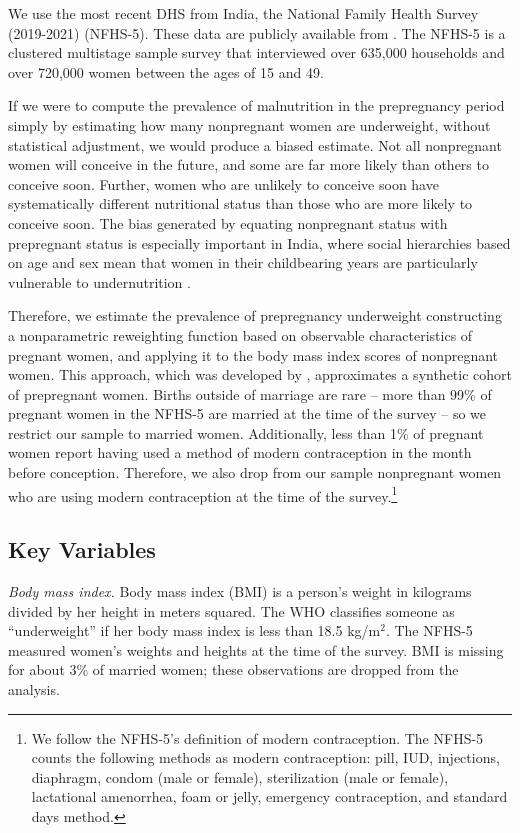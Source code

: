 \documentclass[12pt]{article}
\begin{document}
We use the most recent DHS from India, the National Family Health Survey (2019-2021) (NFHS-5). These data are publicly available from .  The NFHS-5 is a clustered multistage sample survey that interviewed over 635,000 households and over 720,000 women between the ages of 15 and 49.

If we were to compute the prevalence of malnutrition in the prepregnancy period simply by estimating how many nonpregnant women are underweight, without statistical adjustment, we would produce a biased estimate.  Not all nonpregnant women will conceive in the future, and some are far more likely than others to conceive soon.  Further, women who are unlikely to conceive soon have systematically different nutritional status than those who are more likely to conceive soon. The bias generated by equating nonpregnant status with prepregnant status is especially important in India, where social hierarchies based on age and sex mean that women in their childbearing years are particularly vulnerable to undernutrition \citep{gupta1995life, coffey2021neonatal}.  

Therefore, we estimate the prevalence of prepregnancy underweight constructing a nonparametric reweighting function based on observable characteristics of pregnant women, and applying it to the body mass index scores of nonpregnant women.  This approach, which was developed by \cite{coffey2015prepregnancy}, approximates a synthetic cohort of prepregnant women.  Births outside of marriage are rare -- more than 99\% of pregnant women in the NFHS-5 are married at the time of the survey -- so we restrict our sample to married women. Additionally, less than 1\% of pregnant women report having used a method of modern contraception in the month before conception. Therefore, we also drop from our sample nonpregnant women who are using modern contraception at the time of the survey.\footnote{We follow the NFHS-5's definition of modern contraception.  The NFHS-5 counts the following methods as modern contraception: pill, IUD, injections, diaphragm, condom (male or female), sterilization (male or female), lactational amenorrhea, foam or jelly, emergency contraception, and standard days method.} 


\subsection{Key Variables}
\label{subsec:keyvars}

\textit{Body mass index.} Body mass index (BMI) is a person's weight in kilograms divided by her height in meters squared.  The WHO classifies someone as ``underweight'' if her body mass index is less than 18.5 kg/m$^2$.  The NFHS-5 measured women's weights and heights at the time of the survey.  BMI is missing for about 3\% of married women; these observations are dropped from the analysis.
\end{document}
